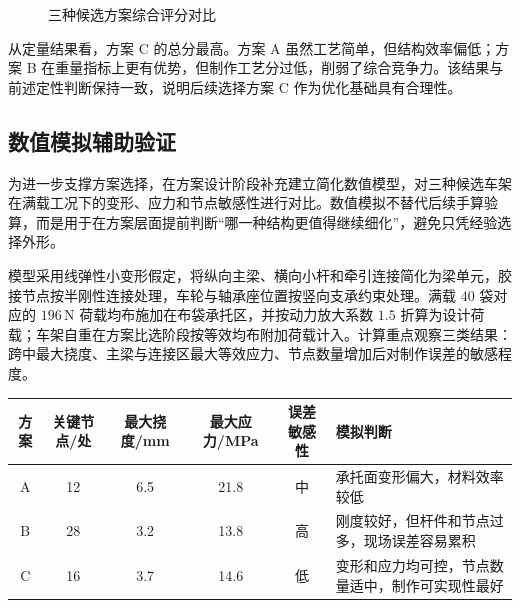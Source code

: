 \documentclass[UTF8,a4paper,12pt,fontset=none]{ctexart}
\renewcommand{\arraystretch}{1.18}
\numberwithin{equation}{section}
\numberwithin{figure}{section}
\numberwithin{table}{section}
\newcommand{\Nunit}{\,\mathrm{N}}
\begin{document}
\begin{figure}[H]
\centering
{}
\caption{三种候选方案综合评分对比}
\label{fig:scheme-score}
\end{figure}

从定量结果看，方案 C 的总分最高。方案 A 虽然工艺简单，但结构效率偏低；方案 B 在重量指标上更有优势，但制作工艺分过低，削弱了综合竞争力。该结果与前述定性判断保持一致，说明后续选择方案 C 作为优化基础具有合理性。

\subsection{数值模拟辅助验证}
为进一步支撑方案选择，在方案设计阶段补充建立简化数值模型，对三种候选车架在满载工况下的变形、应力和节点敏感性进行对比。数值模拟不替代后续手算验算，而是用于在方案层面提前判断“哪一种结构更值得继续细化”，避免只凭经验选择外形。

模型采用线弹性小变形假定，将纵向主梁、横向小杆和牵引连接简化为梁单元，胶接节点按半刚性连接处理，车轮与轴承座位置按竖向支承约束处理。满载 $40$ 袋对应的 $196\Nunit$ 荷载均布施加在布袋承托区，并按动力放大系数 $1.5$ 折算为设计荷载；车架自重在方案比选阶段按等效均布附加荷载计入。计算重点观察三类结果：跨中最大挠度、主梁与连接区最大等效应力、节点数量增加后对制作误差的敏感程度。

\begin{center}
{
\renewcommand{\arraystretch}{1.08}
\begin{tabularx}{0.98\linewidth}{c c c c c Y}
\toprule
\textbf{方案} & \textbf{关键节点/处} & \textbf{最大挠度/mm} & \textbf{最大应力/MPa} & \textbf{误差敏感性} & \textbf{模拟判断} \\\midrule
A & 12 & 6.5 & 21.8 & 中 & 承托面变形偏大，材料效率较低 \\
B & 28 & 3.2 & 13.8 & 高 & 刚度较好，但杆件和节点过多，现场误差容易累积 \\
C & 16 & 3.7 & 14.6 & 低 & 变形和应力均可控，节点数量适中，制作可实现性最好 \\
\bottomrule
\end{tabularx}
}
\end{center}
\end{document}
